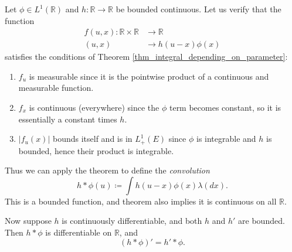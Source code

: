 \documentclass[12pt]{article}
\begin{document}
\begin{example}[convolution]
	Let $\phi \in L^1(\mathbb{R})$  and $h:\mathbb{R}\to\mathbb{R}$ be bounded continuous. Let us verify that the function 
	\begin{align*}
		f(u,x): \mathbb{R}\times\mathbb{R} &\to \mathbb{R} \\
		(u,x) &\to h(u-x)\phi(x)
	\end{align*}
	satisfies the conditions of Theorem \ref{thm_integral_depending_on_parameter}:
	\begin{enumerate}
		\item $f_u$ is measurable since it is the pointwise product of a continuous and measurable function.
		\item $f_x$ is continuous (everywhere) since the $\phi$ term becomes constant, so it is essentially a constant times $h$.
		\item $|f_u(x)|$ bounds itself and is in $L^1_+(E)$ since $\phi$ is integrable and $h$ is bounded, hence their product is integrable.
	\end{enumerate}
	Thus we can apply the theorem to define the \emph{convolution}
	\begin{equation*}
		h \ast \phi(u) \coloneqq \int h(u-x)\phi(x) \lambda(dx).
	\end{equation*}
	This is a bounded function, and theorem also implies it is continuous on all $\mathbb{R}$. 

	Now suppose $h$ is continuously differentiable, and both $h$ and $h'$ are bounded. Then $h\ast\phi$ is differentiable on $\mathbb{R}$, and 
	\begin{equation*}
		(h\ast\phi)' = h'\ast\phi.
	\end{equation*}
\end{example}

\end{document}
